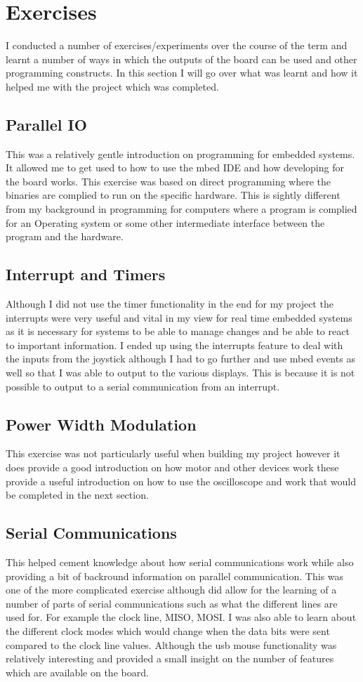 \documentclass[a4paper,12pt]{scrartcl}
\begin{document}
	\section{Exercises}
	{
		I conducted a number of exercises/experiments over the course of the term and learnt a number of ways in which the outputs of the board can be used and other programming constructs. In this section I will go over what was learnt and how it helped me with the project which was completed.
		\subsection{Parallel IO}
		{
			This was a relatively gentle introduction on programming for embedded systems. It allowed me to get used to how to use the mbed IDE and how developing for the board works. This exercise was based on direct programming where the binaries are complied to run on the specific hardware. This is sightly different from my background in programming for computers where a program is complied for an Operating system or some other intermediate interface between the program and the hardware. 
		}
		\subsection{Interrupt and Timers}
		{
			Although I did not use the timer functionality in the end for my project the interrupts were very useful and vital in my view for real time embedded systems as it is necessary for systems to be able to manage changes and be able to react to important information. I ended up using the interrupts feature to deal with the inputs from the joystick although I had to go further and use mbed events\cite{Jongboom2018} as well so that I was able to output to the various displays. This is because it is not possible to output to a serial communication from an interrupt.
		}
		\subsection{Power Width Modulation}
		{
			This exercise was not particularly useful when building my project however it does provide a good introduction on how motor and other devices work these provide a useful introduction on how to use the oscilloscope and work that would be completed in the next section.
		}
		\subsection{Serial Communications}
		{
			This helped cement knowledge about how serial communications work while also providing a bit of backround information on parallel communication. This was one of the more complicated exercise although did allow for the learning of a number of parts of serial communications such as what the different lines are used for. For example the clock line, MISO, MOSI. I was also able to learn about the different clock modes which would change when the data bits were sent compared to the clock line values. Although the usb mouse functionality was relatively interesting and provided a small insight on the number of features which are available on the board.
		}
}
\end{document}
